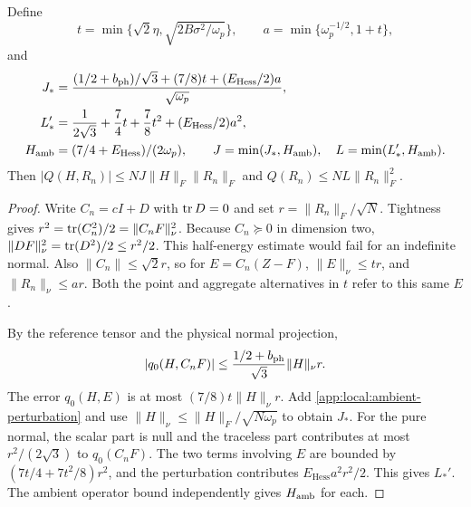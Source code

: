\begin{lemma}\label{app:local:PSD-normal}
Define
\[
 t=\min\{\sqrt2\eta,\sqrt{2B\sigma^2/\omega_p}\},\qquad
 a=\min\{\omega_p^{-1/2},1+t\},
\]
and
\begin{align}
 J_*&=\frac{(1/2+b_{\rm ph})/\sqrt3+(7/8)t+(E_{\mathrm{Hess}}/2)a}{\sqrt{\omega_p}},
 \notag\\
 L_*'&=\frac1{2\sqrt3}+\frac74t+\frac78t^2+(E_{\mathrm{Hess}}/2)a^2,
 \notag\\
 H_{\rm amb}&=(7/4+E_{\mathrm{Hess}})/(2\omega_p),\qquad
 J=\min(J_*,H_{\rm amb}),\quad L=\min(L_*',H_{\rm amb}).
 \label{app:local:JL}
\end{align}
Then
$|Q(H,R_n)|\le NJ\|H\|_F\|R_n\|_F$ and
$Q(R_n)\le NL\|R_n\|_F^2$.
\end{lemma}
\begin{proof}
Write $C_n=cI+D$ with $\operatorname{tr} D=0$ and set
$r=\|R_n\|_F/\sqrt N$. Tightness gives
$r^2=\operatorname{tr}(C_n^2)/2=\|C_nF\|_\nu^2$.
Because $C_n\succeq0$ in dimension two,
$\|DF\|_\nu^2=\operatorname{tr}(D^2)/2\le r^2/2$.
This half-energy estimate would fail for an indefinite normal.
Also $\|C_n\|\le\sqrt2r$, so for $E=C_n(Z-F)$,
$\|E\|_\nu\le tr$, and $\|R_n\|_\nu\le ar$.
Both the point and aggregate alternatives in $t$ refer to this same $E$.

By the reference tensor and the physical normal projection,
\[
 |q_0(H,C_nF)|
 \le\frac{1/2+b_{\rm ph}}{\sqrt3}\|H\|_\nu r .
\]
The error $q_0(H,E)$ is at most $(7/8)t\|H\|_\nu r$.
Add \eqref{app:local:ambient-perturbation} and use
$\|H\|_\nu\le\|H\|_F/\sqrt{N\omega_p}$ to obtain $J_*$.
For the pure normal, the scalar part is null and the traceless part
contributes at most $r^2/(2\sqrt3)$ to $q_0(C_nF)$.
The two terms involving $E$ are bounded by
$(7t/4+7t^2/8)r^2$, and the perturbation contributes
$E_{\mathrm{Hess}} a^2r^2/2$. This gives $L_*'$.
The ambient operator bound independently gives $H_{\rm amb}$ for each.
\end{proof}

